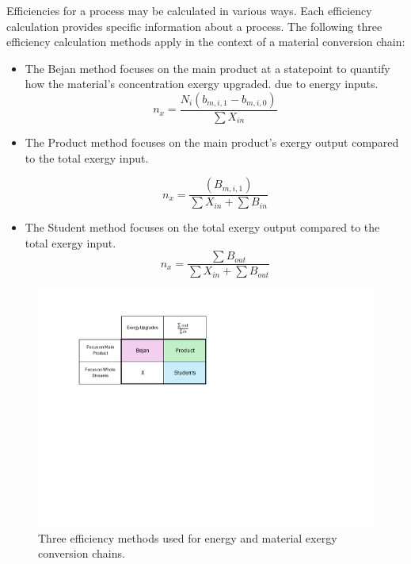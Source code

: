 \documentclass[energies,article,submit,pdftex,moreauthors]{Definitions/mdpi}
\begin{document}
Efficiencies for a process may be calculated
in various ways.
Each efficiency calculation provides specific information
about a process.
The following three efficiency calculation methods apply
in the context of a material conversion chain:

\begin{itemize}
  \item The Bejan method focuses on the main product
  at a statepoint
  to quantify how the material's concentration exergy upgraded.
  due to energy inputs.\\

  \begin{equation}\label{eq:Bejan Efficiency}
  n_{x} = \frac{N_i(b_{m,i,1} - b_{m,i,0})}{\sum{X_{in}}}
  \end{equation}

  \item The Product method focuses on the main product's exergy output
  compared to the total exergy input.

  \begin{equation}\label{eq:Product Efficiency}
  n_{x} = \frac{(B_{m,i,1})}{\sum{X_{in}}+\sum{B_{in}}}
  \end{equation}

  \item The Student method focuses on the total exergy output
  compared to the total exergy input.\\

  \begin{equation}\label{eq:Product Efficiency}
  n_{x} = \frac{\sum{B_{out}}}{\sum{X_{in}} + \sum{B_{out}}}
  \end{equation}
\end{itemize}

\begin{figure}
  \centering
  \includegraphics[width=0.8\linewidth]{images/efficiency_methods.pdf}
  \caption{Three efficiency methods used for energy and material exergy conversion chains.}
  \label{fig:efficiencymethods}
\end{figure}
\end{document}
